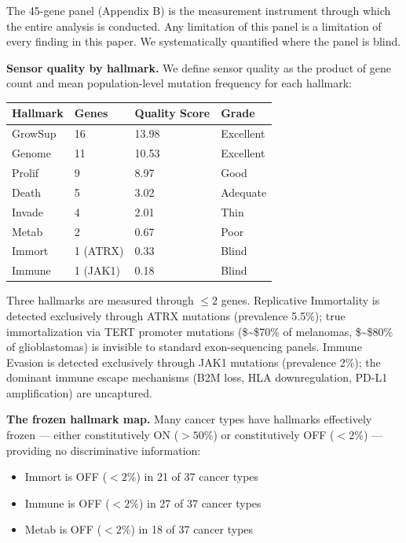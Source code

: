 \documentclass[
  11pt,
]{article}
\newcounter{none} %
\providecommand{\tightlist}{%
  \setlength{\itemsep}{0pt}\setlength{\parskip}{0pt}}
\begin{document}
The 45-gene panel (Appendix B) is the measurement instrument through
which the entire analysis is conducted. Any limitation of this panel is
a limitation of every finding in this paper. We systematically
quantified where the panel is blind.

\textbf{Sensor quality by hallmark.} We define sensor quality as the
product of gene count and mean population-level mutation frequency for
each hallmark:

{\def\LTcaptype{none} %
\begin{longtable}[]{@{}llll@{}}
\toprule\noalign{}
Hallmark & Genes & Quality Score & Grade \\
\midrule\noalign{}
\endhead
\bottomrule\noalign{}
\endlastfoot
GrowSup & 16 & 13.98 & Excellent \\
Genome & 11 & 10.53 & Excellent \\
Prolif & 9 & 8.97 & Good \\
Death & 5 & 3.02 & Adequate \\
Invade & 4 & 2.01 & Thin \\
Metab & 2 & 0.67 & Poor \\
Immort & 1 (ATRX) & 0.33 & Blind \\
Immune & 1 (JAK1) & 0.18 & Blind \\
\end{longtable}
}

Three hallmarks are measured through \(\leq 2\) genes. Replicative
Immortality is detected exclusively through ATRX mutations (prevalence
5.5\%); true immortalization via TERT promoter mutations (\$\sim\$70\%
of melanomas, \$\sim\$80\% of glioblastomas) is invisible to standard
exon-sequencing panels. Immune Evasion is detected exclusively through
JAK1 mutations (prevalence 2\%); the dominant immune escape mechanisms
(B2M loss, HLA downregulation, PD-L1 amplification) are uncaptured.

\textbf{The frozen hallmark map.} Many cancer types have hallmarks
effectively frozen --- either constitutively ON (\(> 50\%\)) or
constitutively OFF (\(< 2\%\)) --- providing no discriminative
information:

\begin{itemize}
\tightlist
\item
  Immort is OFF (\(< 2\%\)) in 21 of 37 cancer types
\item
  Immune is OFF (\(< 2\%\)) in 27 of 37 cancer types
\item
  Metab is OFF (\(< 2\%\)) in 18 of 37 cancer types
\end{itemize}
\end{document}

